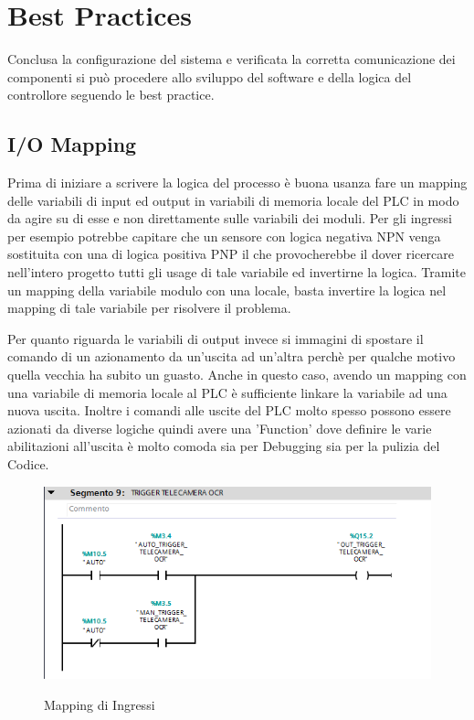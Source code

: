 \documentclass[12pt, a4paper, oneside]{book}
\begin{document}
\section{Best Practices}
Conclusa la configurazione del sistema e verificata la corretta comunicazione dei componenti si può procedere allo sviluppo del software e della logica del controllore seguendo le best practice.

\subsection{I/O Mapping}
Prima di iniziare a scrivere la logica del processo è buona usanza fare un mapping delle variabili di input ed output in variabili di memoria locale del PLC in modo da agire su di esse e non direttamente sulle variabili dei moduli. Per gli ingressi per esempio potrebbe capitare che un sensore con logica negativa NPN venga sostituita con una di logica positiva PNP il che provocherebbe il dover ricercare nell'intero progetto tutti gli usage di tale variabile ed invertirne la logica. Tramite un mapping della variabile modulo con una locale, basta invertire la logica nel mapping di tale variabile per risolvere il problema.

Per quanto riguarda le variabili di output invece si immagini di spostare il comando di un azionamento da un'uscita ad un'altra perchè per qualche motivo quella vecchia ha subito un guasto. Anche in questo caso, avendo un mapping con una variabile di memoria locale al PLC è sufficiente linkare la variabile ad una nuova uscita.
Inoltre i comandi alle uscite del PLC molto spesso possono essere azionati da diverse logiche quindi avere una 'Function' dove definire le varie abilitazioni all'uscita è molto comoda sia per Debugging sia per la pulizia del Codice.



	\begin{figure}[H]
	\centering
	\includegraphics[width=12cm]{Immagini/OUT}
	\label{IN}
	\caption{Mapping di Ingressi}
\end{figure}
\end{document}
